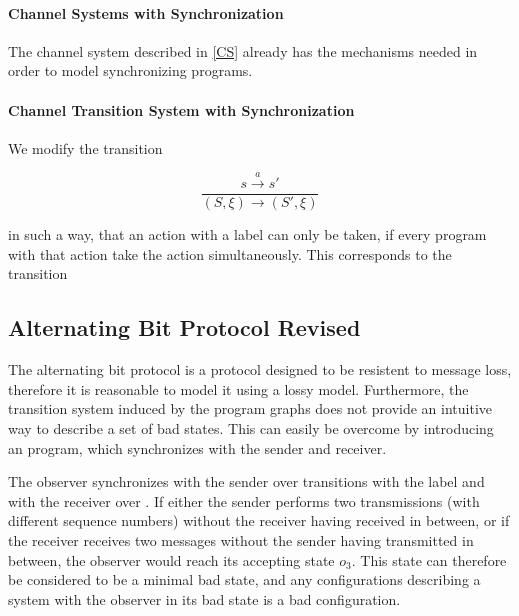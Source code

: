 \paragraph{Channel Systems with Synchronization}
The channel system described in \ref{CS} already has the mechanisms needed in order to model synchronizing programs.

\paragraph{Channel Transition System with Synchronization}
We modify the transition

      \[
      \dfrac{s \xrightarrow{a} s'}{(S, \xi) \rightarrow (S', \xi)}
      \]

in such a way, that an action with a label  can only be taken, if every program with that action take the action simultaneously. This corresponds to the transition



\subsection{Alternating Bit Protocol Revised}
The alternating bit protocol is a protocol designed to be resistent to message loss, therefore it is reasonable to model it using a lossy model. Furthermore, the transition system induced by the program graphs  does not provide an intuitive way to describe a set  of bad states. This can easily be overcome by introducing an  program, which synchronizes with the sender and receiver.

\abpobserver

The observer synchronizes with the sender over transitions with the label  and with the receiver over . If either the sender performs two transmissions (with different sequence numbers) without the receiver having received in between, or if the receiver receives two messages without the sender having transmitted in between, the observer would reach its accepting state $o_3$. This state can therefore be considered to be a minimal bad state, and any configurations describing a system with the observer in its bad state is a bad configuration.
